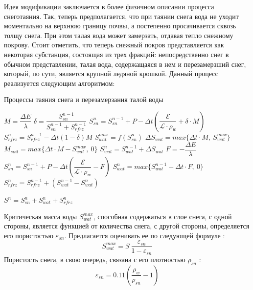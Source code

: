 \documentclass[a4paper, fontsize=14pt]{scrartcl}
\begin{document}
Идея модификации заключается в более физичном описании процесса снеготаяния. Так, теперь предполагается, что при таянии снега вода не уходит моментально на верхнюю границу почвы, а постепенно просачивается сквозь толщу снега. При этом талая вода может замерзать, отдавая тепло снежному покрову. Стоит отметить, что теперь снежный покров представляется как некоторая субстанция, состоящая из трех фракций: непосредственно снег в обычном представлении, талая вода, содержащаяся в нем и перезамерзший снег, который, по сути, является крупной ледяной крошкой. Данный процесс реализуется следующим алгоритмом:

\begin{algorithm}[H]
\caption{Процессы таяния снега и перезамерзания талой воды}
\label{alg:setup}
\begin{algorithmic}[]
        \State $ M = \dfrac{\Delta E}{\lambda} $ 
        \State $ \delta = \dfrac{S_{sn}^{n-1}}{S_{sn}^{n-1} + S_{rfrz}^{n - 1}}$ 
        \State $ S_{sn}^n = S_{sn}^{n-1} + P - \Delta t \left( \dfrac{\mathcal{E}}{\mathcal{L} \cdot \rho_w} + \delta \cdot M \right) $ 
        \State $ S_{rfrz}^n = S_{rfrz}^{n - 1} - \Delta t (1 - \delta)M $ 
        \State $ S_{wat}^{max} = f( S_{sn}^n ) $
        \State $ \Delta S_{wat} = max\{\Delta t \cdot M, ~S_{wat}^{max}\} $ 
        \State $ M_{soil} = max\{\Delta t \cdot M - S_{wat}^{max}, ~0\} $ 
        \State $ S_{wat}^n = S_{wat}^{n-1} + \Delta S_{wat} $ 
    \Else
            \State $F = -\dfrac{\Delta E}{\lambda}$
            \State $S_{sn}^n = S_{sn}^{n-1} + P - \Delta t \left( \dfrac{\mathcal{E}}{\mathcal{L} \cdot \rho_w} - F \right)$
            \State $S_{wat}^n = max\{ S_{wat}^{n-1} - \Delta t \cdot F, ~0\}$
            \State $S_{rfrz}^n = S_{rfrz}^{n - 1} + ( S_{wat}^{n-1} - S_{wat}^n )$
            
        \EndIf
    \EndIf
    \State $S^n = S_{sn}^n + S_{wat}^n + S_{rfrz}^n$
\end{algorithmic}
\end{algorithm}

Критическая масса воды $S_{wat}^{max}$, способная содержаться в слое снега, с одной стороны, является функцией от количества снега, с другой стороны, определяется его пористостью $\varepsilon_{sn}$. Предлагается оценивать ее по следующей формуле \cite{Gusev2002}:
\begin{equation}
     S_{wat}^{max} = S ~\dfrac{\varepsilon_{sn}}{1 - \varepsilon_{sn}}  \label{sys}  
\end{equation}
Пористость снега, в свою очередь, связана с его плотностью $\rho_{sn}$ \cite{Stock}:
\begin{equation}
    \varepsilon_{sn} = 0.11 \left( \dfrac{\rho_w}{\rho_{sn}} - 1 \right)  \label{sys}  
\end{equation}
\end{document}
